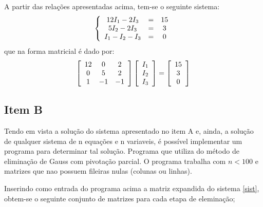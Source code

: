 \documentclass[a4paper,11pt, twoside]{article}
\begin{document}
    A partir das relações apresentadas acima, tem-se o seguinte sistema:
    \begin{equation}\label{sist}
        \left \{ \begin{array}{c c c}
                12I_1 - 2I_3 & = & 15\\
                5I_2 - 2I_3 & = & 3\\
                I_1 - I_2 - I_3 & = & 0
                \end{array} \right .
    \end{equation}
    que na forma matricial é dado por:
    \begin{displaymath}
        \left [\begin{array}{c c c}
                    12 & 0 & 2\\
                    0 & 5 & 2\\
                    1 & -1 & -1
                \end{array} \right ]
        \left [\begin{array}{c}
                    I_1\\
                    I_2\\
                    I_3
                 \end{array} \right ]
        =
        \left [\begin{array}{c}
                    15\\
                    3\\
                    0
                \end{array} \right ]
    \end{displaymath}
    
    \subsection*{Item B}
    Tendo em vista a solução do sistema apresentado no item A e, ainda, a solução de qualquer sistema
    de n equações e n variaveis, é possível implementar um programa para determinar tal solução.
    Programa que utiliza do método de eliminação de Gauss com pivotação parcial.
    O programa trabalha com $n < 100$ e matrizes que nao possuem fileiras nulas (colunas ou linhas).
    
    {\linespread{1.15}
    }
    
    Inserindo como entrada do programa acima a matriz expandida do sistema \eqref{sist}, obtem-se o
    seguinte conjunto de matrizes para cada etapa de eleminação;
    
\end{document}
